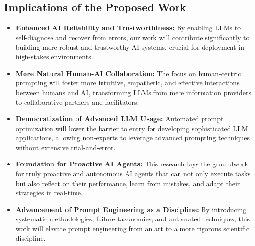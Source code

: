 \documentclass{article}
\begin{document}
\subsection{Implications of the Proposed Work}
\begin{itemize}
    \item \textbf{Enhanced AI Reliability and Trustworthiness:} By enabling LLMs to self-diagnose and recover from errors, our work will contribute significantly to building more robust and trustworthy AI systems, crucial for deployment in high-stakes environments.
    \item \textbf{More Natural Human-AI Collaboration:} The focus on human-centric prompting will foster more intuitive, empathetic, and effective interactions between humans and AI, transforming LLMs from mere information providers to collaborative partners and facilitators.
    \item \textbf{Democratization of Advanced LLM Usage:} Automated prompt optimization will lower the barrier to entry for developing sophisticated LLM applications, allowing non-experts to leverage advanced prompting techniques without extensive trial-and-error.
    \item \textbf{Foundation for Proactive AI Agents:} This research lays the groundwork for truly proactive and autonomous AI agents that can not only execute tasks but also reflect on their performance, learn from mistakes, and adapt their strategies in real-time.
    \item \textbf{Advancement of Prompt Engineering as a Discipline:} By introducing systematic methodologies, failure taxonomies, and automated techniques, this work will elevate prompt engineering from an art to a more rigorous scientific discipline.
\end{itemize}
\end{document}
